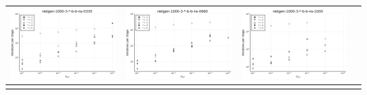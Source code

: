 \documentclass{article}
\begin{document}
\begin{landscape}
\begin{center}
\begin{longtable}{| c | c | c | c |}
\includegraphics[height=0.22\textheight]{itepst_fixlim_netgen-1000-3-_-b-b-ns-0330.png} &
\includegraphics[height=0.22\textheight]{itepst_fixlim_netgen-1000-3-_-b-b-ns-0660.png} &
\includegraphics[height=0.22\textheight]{itepst_fixlim_netgen-1000-3-_-b-b-ns-1000.png} \\
                \hline
\label{table:itepst}
    \end{longtable}
    \end{center}
    \end{landscape}

    
\end{document}
